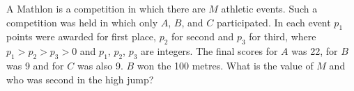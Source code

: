 A Mathlon is a competition in which there are $M$ athletic events.  Such a competition was held in which only $A$,  $B$,  and $C$ participated.  In each event $p_1$ points were awarded for first place, $p_2$ for second and $p_3$ for third, where $p_1 > p_2 > p_3 > 0$ and $p_1$,  $p_2$,  $p_3$ are integers.  The final scores for $A$ was 22, for $B$ was 9 and for $C$ was also 9.  $B$ won the 100 metres.  What is the value of $M$ and who was second in the high jump?